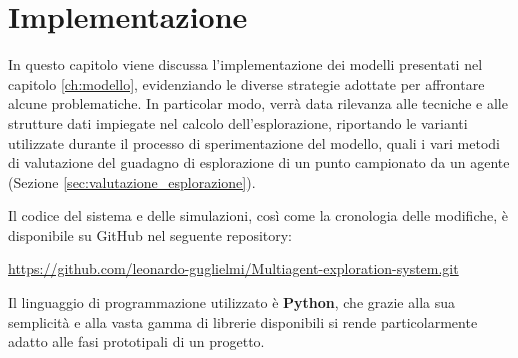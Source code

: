 \chapter{Implementazione} \label{ch:implementazione} %

In questo capitolo viene discussa l'implementazione dei modelli presentati nel capitolo \ref{ch:modello}, evidenziando le diverse strategie adottate per affrontare alcune problematiche.
In particolar modo, verrà data rilevanza alle tecniche e alle strutture dati impiegate nel calcolo dell'esplorazione, riportando le varianti utilizzate durante il processo di sperimentazione del modello, quali i vari metodi di valutazione del guadagno di esplorazione di un punto campionato da un agente (Sezione \ref{sec:valutazione_esplorazione}).

Il codice del sistema e delle simulazioni, così come la cronologia delle modifiche, è disponibile su GitHub nel seguente repository: 

\href{https://github.com/leonardo-guglielmi/Multiagent-exploration-system.git}{\textsf{https://github.com/leonardo-guglielmi/Multiagent-exploration-system.git}}

Il linguaggio di programmazione utilizzato è 
\textbf{Python}, 
che grazie alla sua semplicità e alla vasta gamma di librerie disponibili si rende particolarmente adatto alle fasi prototipali di un progetto.

%
\pagebreak
